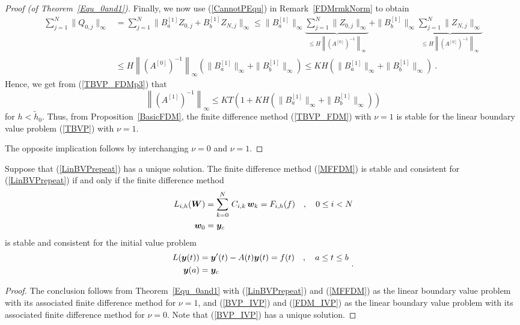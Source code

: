 \begin{proof}[Proof (of Theorem~\ref{Equ_0and1})]
Finally, we now use (\ref{CannotPEqu}) in Remark~\ref{FDMrmkNorm} to
obtain
\begin{align*}
\sum_{j=1}^N \| Q_{0,j} \|_\infty
&= \sum_{j=1}^N \| B_a^{[1]} Z_{0,j} + B_b^{[1]} Z_{N,j} \|_\infty
\leq \|B_a^{[1]}\|_\infty \underbrace{\sum_{j=1}^N \| Z_{0,j} \|_\infty}_{\leq
H \left\|(A^{[0]})^{-1}\right\|_\infty}
+ \| B_b^{[1]}\|_\infty \underbrace{\sum_{j=1}^N \| Z_{N,j} \|_\infty}_{\leq
H \left\|(A^{[0]})^{-1}\right\|_\infty} \\
&\leq H \left\| \left( A^{[0]}\right)^{-1}\right\|_\infty
\left( \| B_a^{[1]} \|_\infty + \| B_b^{[1]} \|_\infty \right)
\leq K H \left( \| B_a^{[1]} \|_\infty + \| B_b^{[1]} \|_\infty \right) \ .
\end{align*}
Hence, we get from
(\ref{TBVP_FDMp3}) that
\[
\left\| \left(A^{[1]}\right)^{-1} \right\|_\infty \leq K T \left(1 + K H \left(
\| B_a^{[1]} \|_\infty + \| B_b^{[1]} \|_\infty \right)\right)
\]
for $h < \tilde{h}_0$.  Thus, from Proposition~\ref{BasicFDM}, the finite
difference method (\ref{TBVP_FDM}) with $\nu=1$ is stable for the
linear boundary value problem (\ref{TBVP}) with $\nu=1$.

The opposite implication follows by interchanging $\nu=0$ and $\nu=1$.
\end{proof}

\begin{cor}
Suppose that (\ref{LinBVPrepeat}) has a unique solution.  The
finite difference method (\ref{MFFDM}) is stable and consistent for
(\ref{LinBVPrepeat}) if and only if the finite difference method
\begin{equation} \label{FDM_IVP}
\begin{split}
L_{i,h}(\bm{W}) &= \sum_{k=0}^N\,C_{i,k}\,\bm{w}_k
= F_{i,h}(f) \quad , \quad 0 \leq i < N \\
\bm{w}_0 &= \bm{y}_c
\end{split}
\end{equation}
is stable and consistent for the initial value problem
\begin{equation} \label{BVP_IVP}
\begin{split}
L(\bm{y}(t)) &= \bm{y}'(t) - A(t)\bm{y}(t) = f(t) \quad ,
\quad a \leq t \leq b\\
\bm{y}(a) &= \bm{y}_c
\end{split} \ .
\end{equation}
\label{CorSC_FDM}
\end{cor}

\begin{proof}
The conclusion follows from Theorem~\ref{Equ_0and1} with
(\ref{LinBVPrepeat}) and (\ref{MFFDM}) as the linear boundary value
problem with its associated finite difference method for $\nu=1$, and
(\ref{BVP_IVP}) and (\ref{FDM_IVP}) as the linear boundary value
problem with its associated finite difference method for $\nu=0$.
Note that (\ref{BVP_IVP}) has a unique solution.
\end{proof}

